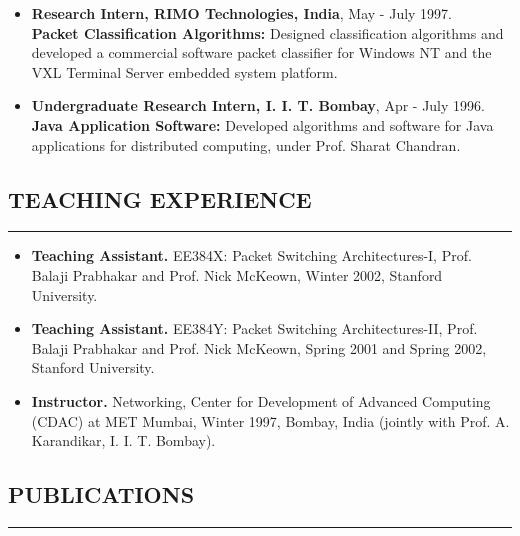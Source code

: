 \documentclass[10pt,a4]{article}
\begin{document}
\begin{small}
\begin{itemize}
\item {\bf Research Intern, RIMO Technologies, India}, May - July 1997. \\
{\bf Packet Classification Algorithms:} Designed classification algorithms and developed a commercial software packet classifier for Windows NT and the VXL Terminal Server embedded system platform.

\item {\bf Undergraduate Research Intern, I. I. T. Bombay}, Apr - July 1996. \\
{\bf Java Application Software:} Developed algorithms and software for Java applications for distributed computing, under Prof. Sharat Chandran.

\end{itemize}



\subsection*{TEACHING EXPERIENCE}
\hrule
\vspace{0.2cm}

\begin{itemize}

\item {\bf Teaching Assistant.} EE384X: Packet Switching Architectures-I, Prof. Balaji
Prabhakar and Prof. Nick McKeown, Winter 2002, Stanford University.

\item {\bf Teaching Assistant.} EE384Y: Packet Switching Architectures-II, Prof. Balaji
Prabhakar and Prof. Nick McKeown,
Spring 2001 and Spring 2002, Stanford University.

\item {\bf Instructor.} Networking, Center for Development of Advanced Computing (CDAC) at MET Mumbai, Winter 1997,
Bombay, India (jointly with Prof. A. Karandikar, I. I. T. Bombay).

\end{itemize}


\subsection*{PUBLICATIONS}
\hrule
\vspace{0.2cm}


\end{small}
\end{document}
